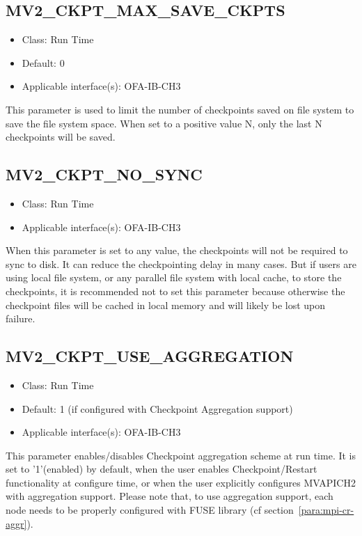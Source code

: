 \subsection{MV2\_CKPT\_MAX\_SAVE\_CKPTS}
\label{def:mv2-max-save-ckpts}
\begin{itemize}
    \item Class: Run Time
    \item Default: 0
    \item Applicable interface(s): OFA-IB-CH3
\end{itemize}
This parameter is used to limit the number of checkpoints saved on
file system to save the file system space. When set to a positive
value N, only the last N checkpoints will be saved.

\subsection{MV2\_CKPT\_NO\_SYNC}
\label{def:mv2-ckpt-no-sync}
\begin{itemize}
    \item Class: Run Time
    \item Applicable interface(s): OFA-IB-CH3
\end{itemize}
When this parameter is set to any value, the checkpoints will not be
required to sync to disk. It can reduce the checkpointing delay in
many cases. But if users are using local file system, or any
parallel file system with local cache, to store the checkpoints, it
is recommended not to set this parameter because otherwise the
checkpoint files will be cached in local memory and will likely be
lost upon failure.

\subsection{MV2\_CKPT\_USE\_AGGREGATION}
\label{def:mv2-ckpt-use-aggregation}
\begin{itemize}
    \item Class: Run Time
    \item Default: 1 (if configured with Checkpoint Aggregation support)
    \item Applicable interface(s): OFA-IB-CH3
\end{itemize}
This parameter enables/disables Checkpoint aggregation scheme at run time.
It is set to '1'(enabled) by default, when the user enables Checkpoint/Restart 
functionality at configure time, or when the user explicitly configures
 MVAPICH2 with aggregation support. Please note that, to use aggregation support,
each node needs to be properly configured with FUSE library
(cf section~\ref{para:mpi-cr-aggr}).

